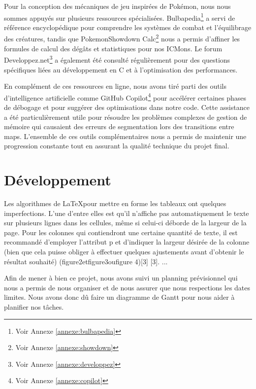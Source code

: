 \documentclass[12pt,a4paper, twoside]{article}
\begin{document}
Pour la conception des mécaniques de jeu inspirées de Pokémon, nous nous sommes appuyés sur plusieurs ressources spécialisées. Bulbapedia\footnote{Voir Annexe \ref{annexe:bulbapedia}} a servi de référence encyclopédique pour comprendre les systèmes de combat et l'équilibrage des créatures, tandis que PokemonShowdown Calc\footnote{Voir Annexe \ref{annexe:showdown}} nous a permis d'affiner les formules de calcul des dégâts et statistiques pour nos ICMons. Le forum Developpez.net\footnote{Voir Annexe \ref{annexe:developpez}} a également été consulté régulièrement pour des questions spécifiques liées au développement en C et à l'optimisation des performances.

En complément de ces ressources en ligne, nous avons tiré parti des outils d'intelligence artificielle comme GitHub Copilot\footnote{Voir Annexe \ref{annexe:copilot}} pour accélérer certaines phases de débogage et pour suggérer des optimisations dans notre code. Cette assistance a été particulièrement utile pour résoudre les problèmes complexes de gestion de mémoire qui causaient des erreurs de segmentation lors des transitions entre maps. L'ensemble de ces outils complémentaires nous a permis de maintenir une progression constante tout en assurant la qualité technique du projet final.
\newpage
\section{Développement}
    Les algorithmes de \LaTeX pour mettre en forme les tableaux ont quelques imperfections. L'une d'entre elles est qu'il n'affiche pas automatiquement le texte sur plusieurs lignes dans les cellules, même si celui-ci déborde de la largeur de la page. Pour les colonnes qui contiendront une certaine quantité de texte, il est recommandé d'employer l'attribut p et d'indiquer la largeur désirée de la colonne (bien que cela puisse obliger à effectuer quelques ajustements avant d'obtenir le résultat souhaité) (figure2etfigure3oufigure 4)[3] [3]. ...

    Afin de mener à bien ce projet, nous avons suivi un planning prévisionnel qui nous a permis de nous organiser et de nous assurer que nous respections les dates limites. Nous avons donc dû faire un diagramme de Gantt pour nous aider à planifier nos tâches.
\end{document}
